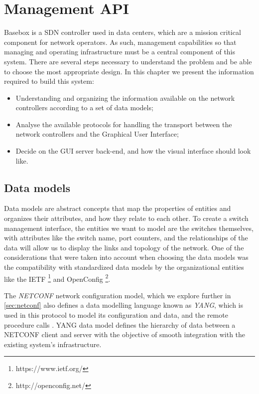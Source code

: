 \chapter {Management API}

Basebox is a SDN controller used in data centers, which are a mission critical component for network operators. As such, management capabilities so that managing
and operating infrastructure must be a central component of this system. There are several steps necessary to understand the problem and be able to choose the most
appropriate design. In this chapter we present the information required to build this system:

\begin{itemize}
    \item Understanding and organizing the information available on the network controllers according to a set of data models;
    \item Analyse the available protocols for handling the transport between the network controllers and the Graphical User Interface;
    \item Decide on the GUI server back-end, and how the visual interface should look like.
\end{itemize}

\section {Data models}

Data models are abstract concepts that map the properties of entities and organizes their attributes, and how they relate to each other. To create a switch 
management interface, the entities we want to model are the switches themselves, with attributes like the switch name, port counters, and the relationships of the 
data will allow us to display the links and topology of the network. One of the considerations that were taken into account when choosing the data models was the
compatibility with standardized data models by the organizational entities like the IETF \footnote{https://www.ietf.org/} and OpenConfig 
\footnote{http://openconfig.net/}.

\par The \textit{NETCONF} \cite{enns_network_2011} network configuration model, which we explore further in \ref{sec:netconf} also defines a data modelling language 
known as \textit{YANG}, which is used in this protocol to model its configuration and data, and the remote procedure calls \cite{bjorklund_yang_2010}. 
YANG data model defines the hierarchy of data between a NETCONF client and server with the objective of smooth integration with the existing system's infrastructure. 

